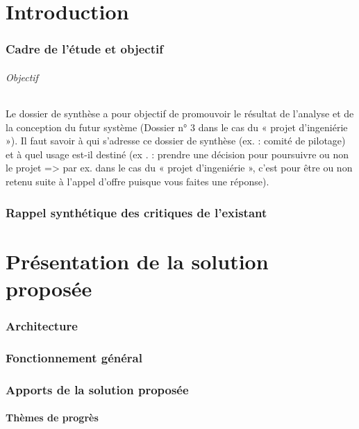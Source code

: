 \documentclass[a4paper]{article}
\begin{document}
\part{Introduction}

\section{Cadre de l’étude et objectif}

\paragraph{Objectif}
Le dossier de synthèse a pour objectif de promouvoir le résultat de l’analyse et de la
conception du futur système (Dossier n° 3 dans le cas du « projet d’ingeniérie »). Il faut savoir
à qui s’adresse ce dossier de synthèse (ex. : comité de pilotage) et à quel usage est-il destiné
(ex . : prendre une décision pour poursuivre ou non le projet => par ex. dans le cas du « projet
d’ingeniérie », c’est pour être ou non retenu suite à l’appel d’offre puisque vous faites une réponse).

\section{Rappel synthétique des critiques de l’existant}



\part{Présentation de la solution proposée}

\section{Architecture}

\section{Fonctionnement général}

\section{Apports de la solution proposée}

\subsection{Thèmes de progrès}
\end{document}
